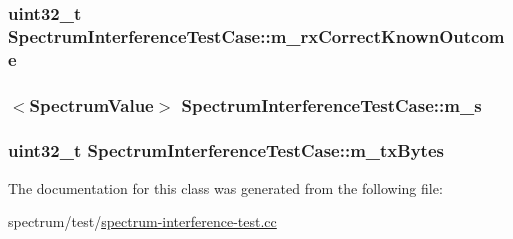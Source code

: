 \subsubsection[{\texorpdfstring{m\+\_\+rx\+Correct\+Known\+Outcome}{m_rxCorrectKnownOutcome}}]{\setlength{\rightskip}{0pt plus 5cm}uint32\+\_\+t Spectrum\+Interference\+Test\+Case\+::m\+\_\+rx\+Correct\+Known\+Outcome\hspace{0.3cm}{\ttfamily [private]}}\hypertarget{classSpectrumInterferenceTestCase_a268077aa81eb5cdbedbce6381bc1779e}{}\label{classSpectrumInterferenceTestCase_a268077aa81eb5cdbedbce6381bc1779e}
\subsubsection[{\texorpdfstring{m\+\_\+s}{m_s}}]{$<${\bf Spectrum\+Value}$>$ Spectrum\+Interference\+Test\+Case\+::m\+\_\+s\hspace{0.3cm}{\ttfamily [private]}}\hypertarget{classSpectrumInterferenceTestCase_a4bd1bb6c7ac90a2ad710183359867f56}{}\label{classSpectrumInterferenceTestCase_a4bd1bb6c7ac90a2ad710183359867f56}
\subsubsection[{\texorpdfstring{m\+\_\+tx\+Bytes}{m_txBytes}}]{\setlength{\rightskip}{0pt plus 5cm}uint32\+\_\+t Spectrum\+Interference\+Test\+Case\+::m\+\_\+tx\+Bytes\hspace{0.3cm}{\ttfamily [private]}}\hypertarget{classSpectrumInterferenceTestCase_a880beadd18916a76221e6d6eb7d761f7}{}\label{classSpectrumInterferenceTestCase_a880beadd18916a76221e6d6eb7d761f7}


The documentation for this class was generated from the following file\+:\begin{DoxyCompactItemize}
\item 
spectrum/test/\hyperlink{spectrum-interference-test_8cc}{spectrum-\/interference-\/test.\+cc}\end{DoxyCompactItemize}
